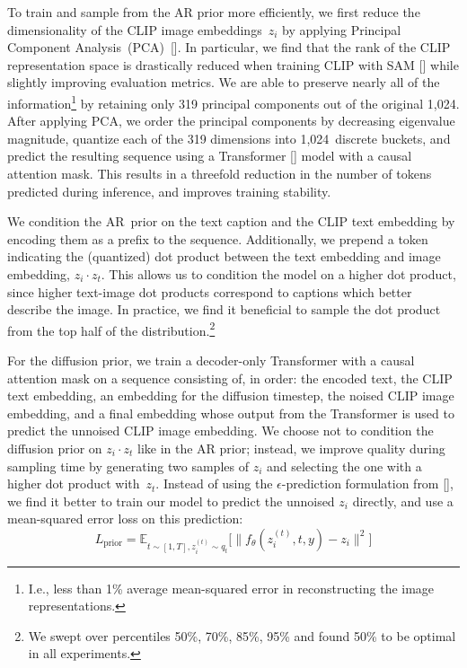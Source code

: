 \documentclass{article}
\newcommand{\shortcite}[1]{[\citenum{#1}]}
\newcommand{\namecite}[1]{\citeauthor{#1} [\citenum{#1}]}
\begin{document}
To train and sample from the AR prior more efficiently, we first reduce the dimensionality of the CLIP image embeddings~$z_i$ by applying Principal Component Analysis~(PCA)~\shortcite{pca}. In particular, we find that the rank of the CLIP representation space is drastically reduced when training CLIP with SAM \shortcite{sam} while slightly improving evaluation metrics. We are able to preserve nearly all of the information\footnote{I.e., less than 1\% average mean-squared error in reconstructing the image representations.} by retaining only 319 principal components out of the original 1,024. After applying PCA, we order the principal components by decreasing eigenvalue magnitude, quantize each of the 319 dimensions into 1,024~discrete buckets, and predict the resulting sequence using a Transformer \shortcite{transformer} model with a causal attention mask. This results in a threefold reduction in the number of tokens predicted during inference, and improves training stability.

We condition the AR~prior on the text caption and the CLIP text embedding by encoding them as a prefix to the sequence. Additionally, we prepend a token indicating the (quantized) dot product between the text embedding and image embedding, $z_i \cdot z_t$. This allows us to condition the model on a higher dot product, since higher text-image dot products correspond to captions which better describe the image. In practice, we find it beneficial to sample the dot product from the top half of the distribution.\footnote{We swept over percentiles 50\%, 70\%, 85\%, 95\% and found 50\% to be optimal in all experiments.} 

For the diffusion prior, we train a decoder-only Transformer with a causal attention mask on a sequence consisting of, in order: the encoded text, the CLIP text embedding, an embedding for the diffusion timestep, the noised CLIP image embedding, and a final embedding whose output from the Transformer is used to predict the unnoised CLIP image embedding. We choose not to condition the diffusion prior on $z_i \cdot z_t$ like in the AR prior; instead, we improve quality during sampling time by generating two samples of $z_i$ and selecting the one with a higher dot product with~$z_t$. Instead of using the $\epsilon$-prediction formulation from \namecite{ddpm}, we find it better to train our model to predict the unnoised $z_i$ directly, and use a mean-squared error loss on this prediction:
$$L_{\text{prior}} = \mathbb{E}_{t \sim [1,T], z_i^{(t)} \sim q_t} \big[\|f_{\theta}(z_i^{(t)}, t, y) - z_i\|^2\big]$$
\end{document}
